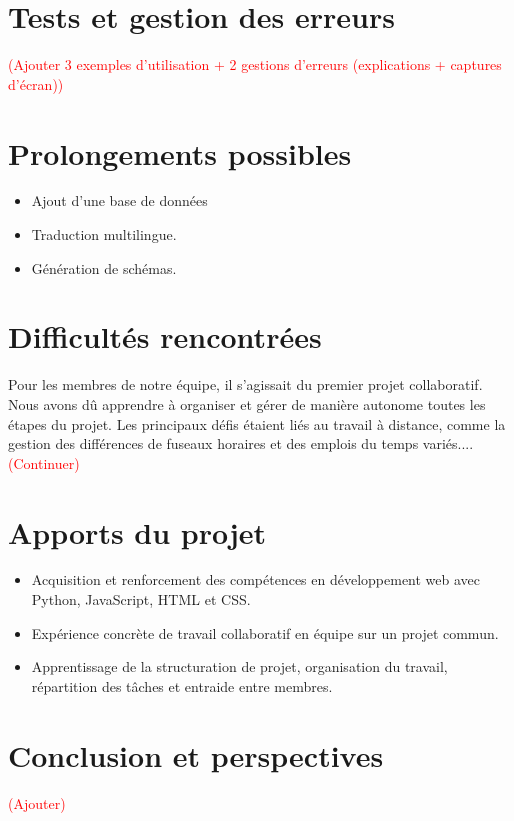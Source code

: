\documentclass{article}
\begin{document}
	
	\section{Tests et gestion des erreurs}
	
	\textcolor{red}{(Ajouter 3 exemples d’utilisation + 2 gestions d’erreurs (explications + captures d’écran))}
	
	\section{Prolongements possibles}
	
	\begin{itemize}
		\item Ajout d'une base de données 
		\item Traduction multilingue.
		\item Génération de schémas.
	\end{itemize}
	
	\section{Difficultés rencontrées}
	Pour les membres de notre équipe, il s’agissait du premier projet collaboratif. Nous avons dû apprendre à organiser et gérer de manière autonome toutes les étapes du projet. Les principaux défis étaient liés au travail à distance, comme la gestion des différences de fuseaux horaires et des emplois du temps variés.... 	\textcolor{red}{(Continuer)}\\
	\section{Apports du projet}
	
	\begin{itemize}
		\item Acquisition et renforcement des compétences en développement web avec Python, JavaScript, HTML et CSS.
		\item Expérience concrète de travail collaboratif en équipe sur un projet commun.
		\item Apprentissage de la structuration de projet, organisation du travail, répartition des tâches et entraide entre membres.
	\end{itemize}

	\section{Conclusion et perspectives}
	\textcolor{red}{(Ajouter)}

	
\end{document}
